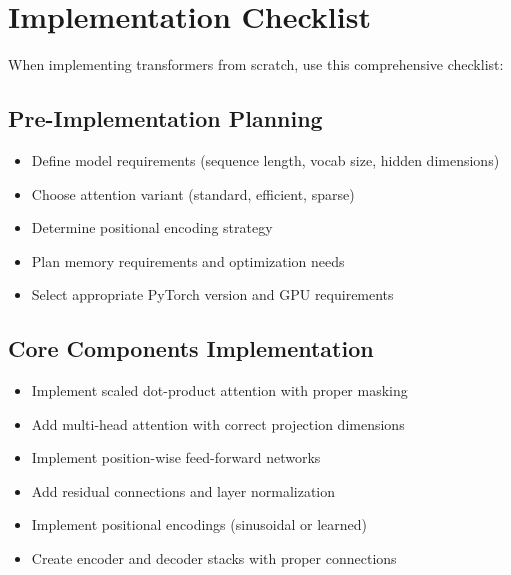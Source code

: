 \section{Implementation Checklist}

When implementing transformers from scratch, use this comprehensive checklist:

\subsection{Pre-Implementation Planning}
\begin{itemize}
    \item[$\square$] Define model requirements (sequence length, vocab size, hidden dimensions)
    \item[$\square$] Choose attention variant (standard, efficient, sparse)
    \item[$\square$] Determine positional encoding strategy
    \item[$\square$] Plan memory requirements and optimization needs
    \item[$\square$] Select appropriate PyTorch version and GPU requirements
\end{itemize}

\subsection{Core Components Implementation}
\begin{itemize}
    \item[$\square$] Implement scaled dot-product attention with proper masking
    \item[$\square$] Add multi-head attention with correct projection dimensions
    \item[$\square$] Implement position-wise feed-forward networks
    \item[$\square$] Add residual connections and layer normalization
    \item[$\square$] Implement positional encodings (sinusoidal or learned)
    \item[$\square$] Create encoder and decoder stacks with proper connections
\end{itemize}

